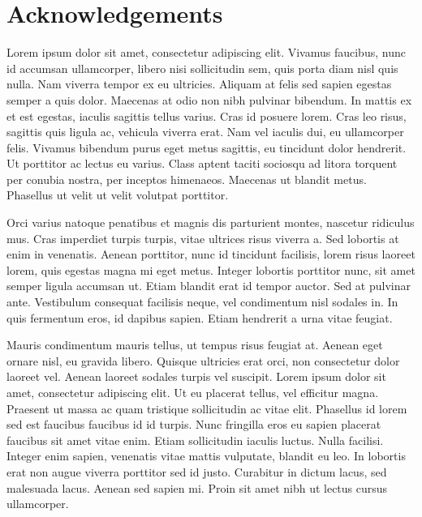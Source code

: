 \chapter{Acknowledgements}

Lorem ipsum dolor sit amet, consectetur adipiscing elit. Vivamus faucibus, nunc id accumsan ullamcorper, libero nisi sollicitudin sem, quis porta diam nisl quis nulla. Nam viverra tempor ex eu ultricies. Aliquam at felis sed sapien egestas semper a quis dolor. Maecenas at odio non nibh pulvinar bibendum. In mattis ex et est egestas, iaculis sagittis tellus varius. Cras id posuere lorem. Cras leo risus, sagittis quis ligula ac, vehicula viverra erat. Nam vel iaculis dui, eu ullamcorper felis. Vivamus bibendum purus eget metus sagittis, eu tincidunt dolor hendrerit. Ut porttitor ac lectus eu varius. Class aptent taciti sociosqu ad litora torquent per conubia nostra, per inceptos himenaeos. Maecenas ut blandit metus. Phasellus ut velit ut velit volutpat porttitor.

Orci varius natoque penatibus et magnis dis parturient montes, nascetur ridiculus mus. Cras imperdiet turpis turpis, vitae ultrices risus viverra a. Sed lobortis at enim in venenatis. Aenean porttitor, nunc id tincidunt facilisis, lorem risus laoreet lorem, quis egestas magna mi eget metus. Integer lobortis porttitor nunc, sit amet semper ligula accumsan ut. Etiam blandit erat id tempor auctor. Sed at pulvinar ante. Vestibulum consequat facilisis neque, vel condimentum nisl sodales in. In quis fermentum eros, id dapibus sapien. Etiam hendrerit a urna vitae feugiat.

Mauris condimentum mauris tellus, ut tempus risus feugiat at. Aenean eget ornare nisl, eu gravida libero. Quisque ultricies erat orci, non consectetur dolor laoreet vel. Aenean laoreet sodales turpis vel suscipit. Lorem ipsum dolor sit amet, consectetur adipiscing elit. Ut eu placerat tellus, vel efficitur magna. Praesent ut massa ac quam tristique sollicitudin ac vitae elit. Phasellus id lorem sed est faucibus faucibus id id turpis. Nunc fringilla eros eu sapien placerat faucibus sit amet vitae enim. Etiam sollicitudin iaculis luctus. Nulla facilisi. Integer enim sapien, venenatis vitae mattis vulputate, blandit eu leo. In lobortis erat non augue viverra porttitor sed id justo. Curabitur in dictum lacus, sed malesuada lacus. Aenean sed sapien mi. Proin sit amet nibh ut lectus cursus ullamcorper.

